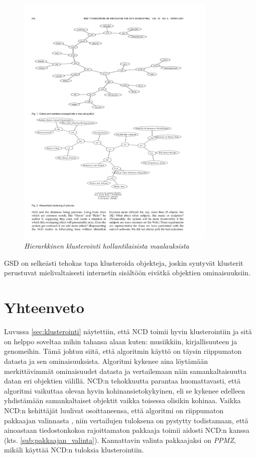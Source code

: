 \documentclass[12pt,finnish]{tktltiki2}
\theoremstyle{definition}
\theoremstyle{remark}
\begin{document}
      \begin{figure}[tb]
        \immediate{}
        \includegraphics[width=\textwidth, height=350pt]{img/dutch-paintings}
        \caption{\emph{Hierarkkinen klusterointi hollantilaisista maalauksista} \cite{cilibrasi2007google} }
        \label{fig:dutch-paintings}
      \end{figure}

      GSD on selkeästi \cite{cilibrasi2007google} tehokas tapa klusteroida objekteja, joskin syntyvät klusterit perustuvat mielivaltaisesti internetin sisältöön eivätkä objektien ominaisuuksiin.




\section{Yhteenveto} %
\label{sec:yhteenveto}

  Luvussa \ref{sec:klusterointi} näytettiin, että NCD toimii hyvin klusterointiin ja sitä on helppo soveltaa mihin tahansa alaan kuten: musiikkiin, kirjallisuuteen ja genomeihin. Tämä johtuu siitä, että algoritmin käyttö on täysin riippumaton datasta ja sen ominaisuuksista. Algoritmi kykenee aina löytämään merkittävimmät ominaisuudet datasta ja vertailemaan näin samankaltaisuutta datan eri objektien välillä.
  NCD:n tehokkuutta parantaa huomattavasti, että algoritmi vaikuttaa olevan hyvin kohinansietokykyinen, eli se kykenee edelleen yhdistämään samankaltaiset objektit vaikka toisessa olisikin kohinaa.
  Vaikka NCD:n kehittäjät luulivat osoittaneensa, että algoritmi on riippumaton pakkaajan valinnasta \cite{CV05}, niin vertailujen tuloksena on pystytty todistamaan, että ainoastaan tiedostonkokoa rajoittamaton pakkaaja toimii aidosti NCD:n kanssa (kts. \ref{sub:pakkaajan_valinta}).
  Kannattavin valinta pakkaajaksi on \emph{PPMZ}, mikäli käyttää NCD:n tuloksia klusterointiin.
\end{document}
